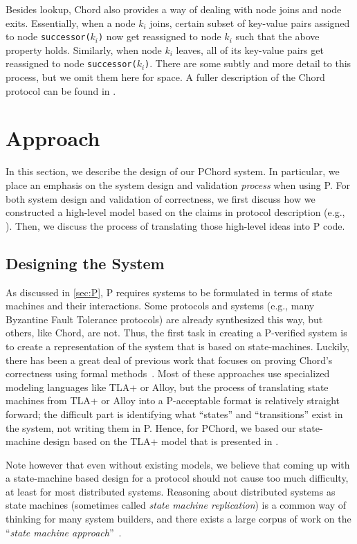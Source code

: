 \documentclass[conference]{IEEEtran}
\begin{document}
Besides lookup, Chord also provides a way of dealing with node joins and node exits. Essentially, when a node $k_i$ joins, certain subset of key-value pairs assigned to node \texttt{successor($k_i$)} now get reassigned to node $k_i$ such that the above property holds. Similarly, when node $k_i$ leaves, all of its key-value pairs get reassigned to node \texttt{successor($k_i$)}. There are some subtly and more detail to this process, but we omit them here for space. A fuller description of the Chord protocol can be found in \cite{stoica_chord_2001}.

\section{Approach}
In this section, we describe the design of our PChord system. In particular, we place an emphasis on the system design and validation \textit{process} when using P. For both system design and validation of correctness, we first discuss how we constructed a high-level model based on the claims in protocol description (e.g., \cite{stoica_chord_2001}). Then, we discuss the process of translating those high-level ideas into P code.

\subsection{Designing the System}
\label{sec:system-design}
As discussed in \autoref{sec:P}, P requires systems to be formulated in terms of state machines and their interactions. Some protocols and systems (e.g., many Byzantine Fault Tolerance protocols) are already synthesized this way, but others, like Chord, are not. Thus, the first task in creating a P-verified system is to create a representation of the system that is based on state-machines. Luckily, there has been a great deal of previous work that focuses on proving Chord's correctness using formal methods~\cite{zave_reasoning_2017,zave_using_2012,lund_verification_2019}. Most of these approaches use specialized modeling languages like TLA+ or Alloy, but the process of translating state machines from TLA+ or Alloy into a P-acceptable format is relatively straight forward; the difficult part is identifying what ``states'' and ``transitions'' exist in the system, not writing them in P. Hence, for PChord, we based our state-machine design based on the TLA+ model that is presented in \cite{lund_verification_2019}.

Note however that even without existing models, we believe that coming up with a state-machine based design for a protocol should not cause too much difficulty, at least for most distributed systems. Reasoning about distributed systems as state machines (sometimes called \textit{state machine replication}) is a common way of thinking for many system builders, and there exists a large corpus of work on the ``\textit{state machine approach}''~\cite{schneider_implementing_1990}.
\end{document}
